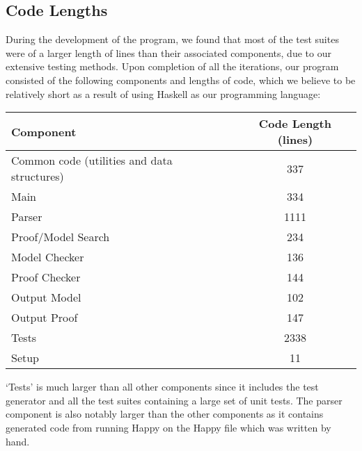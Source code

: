 \subsection{Code Lengths}

During the development of the program, we found that most of the test suites were of a larger length of lines than their associated components, due to our extensive testing methods. Upon completion of all the iterations, our program consisted of the following components and lengths of code, which we believe to be relatively short as a result of using Haskell as our programming language:

\begin{center}
  \begin{tabular}{|l|c|}
\hline
\textbf{Component} & \textbf{Code Length (lines)} \\
\hline
Common code (utilities and data structures) & 337\\
\hline
Main & 334\\
\hline
Parser & 1111\\
\hline
Proof/Model Search & 234\\
\hline
Model Checker & 136\\
\hline
Proof Checker & 144\\
\hline
Output Model & 102\\
\hline
Output Proof & 147\\
\hline
Tests & 2338\\
\hline
Setup & 11\\
\hline
\end{tabular}
\end{center}

`Tests' is much larger than all other components since it includes the test generator and all the test suites containing a large set of unit tests. The parser component is also notably larger than the other components as it contains generated code from running Happy on the Happy file which was written by hand.
